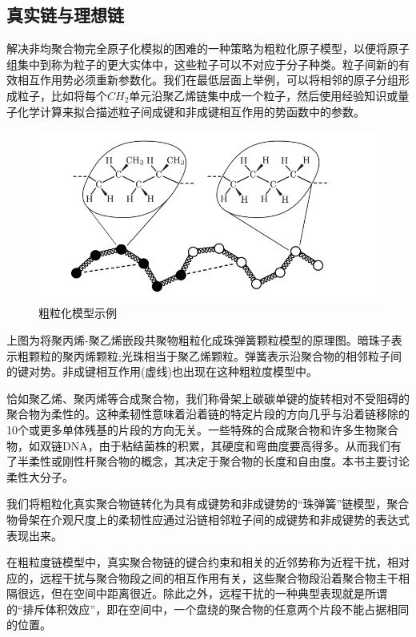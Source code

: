 \subsection{真实链与理想链}
解决非均聚合物完全原子化模拟的困难的一种策略为粗粒化原子模型，以便将原子组集中到称为粒子的更大实体中，这些粒子可以不对应于分子种类。粒子间新的有效相互作用势必须重新参数化。我们在最低层面上举例，可以将相邻的原子分组形成粒子，比如将每个$CH_2$单元沿聚乙烯链集中成一个粒子，然后使用经验知识或量子化学计算来拟合描述粒子间成键和非成键相互作用的势函数中的参数。

\begin{figure}[h]
\centering
\includegraphics[scale=0.5
]{./figures/1-3.png}
\caption{粗粒化模型示例}
\end{figure}

上图为将聚丙烯-聚乙烯嵌段共聚物粗粒化成珠弹簧颗粒模型的原理图。暗珠子表示粗颗粒的聚丙烯颗粒;光珠相当于聚乙烯颗粒。弹簧表示沿聚合物的相邻粒子间的键对势。非成键相互作用(虚线)也出现在这种粗粒度模型中。

恰如聚乙烯、聚丙烯等合成聚合物，我们称骨架上碳碳单键的旋转相对不受阻碍的聚合物为柔性的。这种柔韧性意味着沿着链的特定片段的方向几乎与沿着链移除的10个或更多单体残基的片段的方向无关。一些特殊的合成聚合物和许多生物聚合物，如双链DNA，由于粘结菌株的积累，其硬度和弯曲度要高得多。从而我们有了半柔性或刚性杆聚合物的概念，其决定于聚合物的长度和自由度。本书主要讨论柔性大分子。

我们将粗粒化真实聚合物链转化为具有成键势和非成键势的“珠弹簧”链模型，聚合物骨架在介观尺度上的柔韧性应通过沿链相邻粒子间的成键势和非成键势的表达式表现出来。

在粗粒度链模型中，真实聚合物链的键合约束和相关的近邻势称为近程干扰，相对应的，远程干扰与聚合物段之间的相互作用有关，这些聚合物段沿着聚合物主干相隔很远，但在空间中距离很近。除此之外，远程干扰的一种典型表现就是所谓的“排斥体积效应”，即在空间中，一个盘绕的聚合物的任意两个片段不能占据相同的位置。

